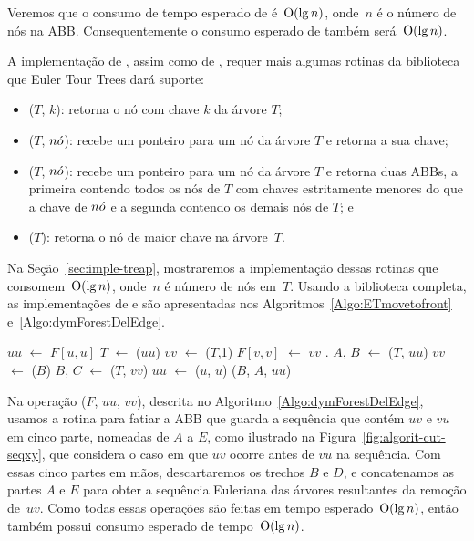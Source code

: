 Veremos que o consumo de tempo esperado de \ETmovetofront{} é~$\mathrm{O}(\lg n)$, onde~$n$ é o número de nós na ABB. Consequentemente o consumo esperado de \dymForestAddEdge{} também será~$\mathrm{O}(\lg n)$.

A implementação de \ETmovetofront{}, assim como de \dymForestDelEdge{}, requer mais algumas rotinas da biblioteca que Euler Tour Trees dará suporte:

\begin{itemize}
\item \treapSearch($T$, $k$): retorna o nó com chave $k$ da árvore $T$;
\item \treapOrder($T$, $n\acute{o}$): recebe um ponteiro para um nó da árvore $T$ e retorna a sua chave;
\item \treapSplit($T$, $n\acute{o}$): recebe um ponteiro para um nó da árvore $T$ e retorna duas ABBs, a primeira contendo todos os nós de $T$ com chaves estritamente menores do que a chave de $n\acute{o}$ e a segunda contendo os demais nós de $T$; e
\item \treapGetLast($T$): retorna o nó de maior chave na árvore~$T$.
\end{itemize}

Na Seção~\ref{sec:imple-treap}, mostraremos a implementação dessas rotinas que consomem~$\mathrm{O}(\lg n)$, onde~$n$ é número de nós em~$T$. Usando a biblioteca completa, as implementações de \ETmovetofront{} e \dymForestDelEdge{} são apresentadas nos Algoritmos~\ref{Algo:ETmovetofront} e~\ref{Algo:dymForestDelEdge}.

\begin{algorithm}[htb]
\caption{\ETmovetofront($F$, $u$)}
\label{Algo:ETmovetofront}
\begin{algorithmic}[1]
\State $uu$ $\gets$ $F[u,u]$
\State $T$ $\gets$ \treapGetRoot($uu$)
\State $vv$ $\gets$ \treapSearch($T$,1)
 
\State $F[v,v]$ $\gets$ $vv$ .
\State $A$, $B$ $\gets$ \treapSplit($T$, $uu$)
\State $vv$ $\gets$ \treapGetLast($B$)
\State $B$, $C$ $\gets$ \treapSplit($T$, $vv$)
\State $uu$ $\gets$ \treapCreate($u$, $u$)
\State \treapJoin($B$, $A$, $uu$)
\EndIf
\end{algorithmic}
\end{algorithm}

Na operação \dymForestDelEdge($F$, $uu$, $vv$), descrita no Algoritmo~\ref{Algo:dymForestDelEdge}, usamos a rotina \treapSplit{} para fatiar a ABB que guarda a sequência que contém $uv$ e $vu$ em cinco parte, nomeadas de $A$ a $E$, como ilustrado na Figura~\ref{fig:algorit-cut-seqxy}, que considera o caso em que $uv$ ocorre antes de $vu$ na sequência. Com essas cinco partes em mãos, descartaremos os trechos $B$ e $D$, e concatenamos as partes $A$ e $E$ para obter a sequência Euleriana das árvores resultantes da remoção de~$uv$. Como todas essas operações são feitas em tempo esperado~$\mathrm{O}(\lg n)$, então \dymForestDelEdge{} também possui consumo esperado de tempo~$\mathrm{O}(\lg n)$.

